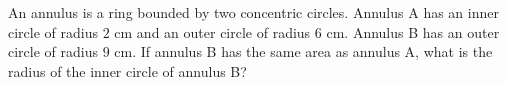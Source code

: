 An annulus is a ring bounded by two concentric circles. Annulus A has an inner circle of radius $2$ cm and an outer circle of radius $6$ cm. Annulus B has an outer circle of radius $9$ cm. If annulus B has the same area as annulus A, what is the radius of the inner circle of annulus B?
